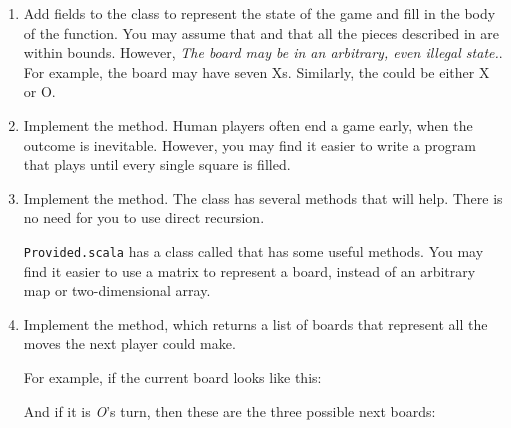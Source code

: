 \documentclass{book}
\begin{document}
\begin{enumerate}

\item
   Add fields to the  class to represent the state of the game and
   fill in the body of the  function.
   You may assume that  and that all the pieces described
   in  are within bounds. However, \emph{The board may be in an
   arbitrary, even illegal state.}. For example, the board may have seven Xs.
   Similarly, the  could be either X or O.


\item Implement the  method. Human players often end a game early,
   when the outcome is inevitable. However, you may find it easier to write a
   program that plays until every single square is filled.


\item Implement the  method. The  class has several methods
   that will help. There is no need for you to use direct recursion.

   \texttt{Provided.scala} has a class called  that
   has some useful methods. You may find it easier to use a matrix to represent
   a board, instead of an arbitrary map or two-dimensional array.

\item Implement the  method, which returns a list of
   boards that represent all the moves the next player could make.

   For example, if the current board looks like this:


And if it is \emph{O}'s turn, then these are the three possible next boards:


\end{enumerate}
\end{document}
